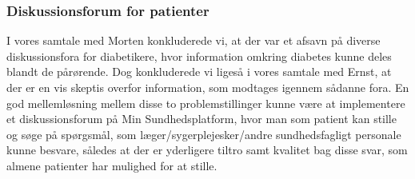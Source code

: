 \subsubsection{Diskussionsforum for patienter}
I vores samtale med Morten konkluderede vi, at der var et afsavn på diverse diskussionsfora for diabetikere, hvor information omkring diabetes kunne deles blandt de pårørende.
Dog konkluderede vi ligeså i vores samtale med Ernst, at der er en vis skeptis overfor information, som modtages igennem sådanne fora. En god mellemløsning mellem disse to problemstillinger kunne være at implementere et diskussionsforum på Min Sundhedsplatform, hvor man som patient kan stille og søge på spørgsmål, som læger/sygerplejesker/andre sundhedsfagligt personale kunne besvare, således at der er yderligere tiltro samt kvalitet bag disse svar, som almene patienter har mulighed for at stille. 

